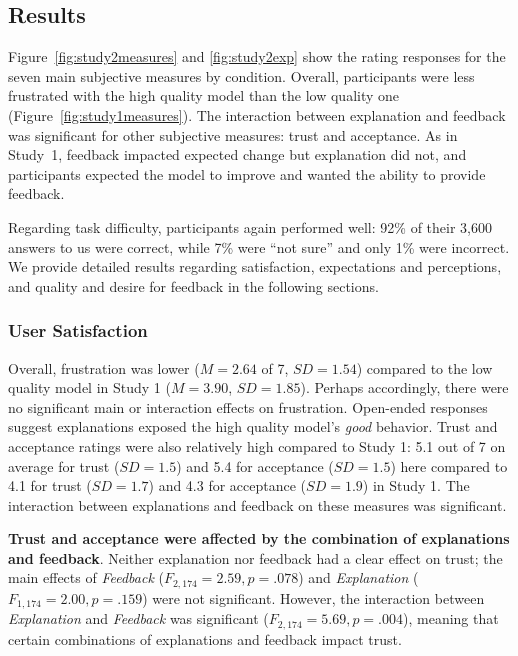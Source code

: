 
\FigureHighMeasure

\subsection{Results}
Figure~\ref{fig:study2measures} and \ref{fig:study2exp} show the rating responses for the seven main subjective measures by condition.
Overall, participants were less frustrated with the high quality model than the low quality one (Figure~\ref{fig:study1measures}). 
%
The interaction between explanation and feedback was significant for other subjective measures: trust and acceptance. 
As in Study~1, feedback impacted expected change but explanation did not, and participants expected the model to improve and wanted the ability to provide feedback.

Regarding task difficulty, participants again performed well: 92\% of their 3,600 answers to us were correct, while 7\% were ``not sure'' and only 1\% were incorrect. 
%
We provide detailed results regarding satisfaction, expectations and perceptions, and quality and desire for feedback in the following sections.


\subsubsection{User Satisfaction}
%
Overall, frustration was lower ($M=2.64$ of 7, $SD=1.54$) compared to the low quality model in Study 1 ($M=3.90$, $SD=1.85$). Perhaps accordingly, there were no significant main or interaction effects on frustration. Open-ended responses suggest explanations exposed the high quality model's \textit{good} behavior.
%
Trust and acceptance ratings were also relatively high compared to Study 1: 5.1 out of 7 on average for trust ($SD=1.5$) and 5.4 for acceptance ($SD=1.5$) here compared to 4.1 for trust ($SD=1.7$) and 4.3 for acceptance ($SD=1.9$) in Study 1. The interaction between explanations and feedback on these measures was significant.

\textbf{Trust and acceptance were affected by the combination of explanations and feedback}.
%
Neither explanation nor feedback had a clear effect on trust; the main effects of \textit{Feedback} ($F_{2,174}=2.59, p=.078$) and \textit{Explanation} ($F_{1,174}=2.00, p=.159$) were not significant. However, the interaction between \textit{Explanation} and \textit{Feedback} was significant ($F_{2,174}=5.69, p=.004$), meaning that certain combinations of explanations and feedback impact trust. 

